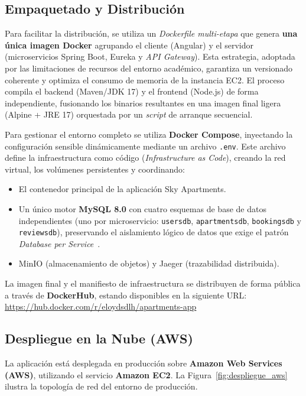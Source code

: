 \subsection{Empaquetado y Distribución}

Para facilitar la distribución, se utiliza un \textit{Dockerfile multi-etapa} que genera 
\textbf{una única imagen Docker} agrupando el cliente (Angular) y el servidor (microservicios 
Spring Boot, Eureka y \textit{API Gateway}). Esta estrategia, adoptada por las limitaciones de recursos 
del entorno académico, garantiza un versionado coherente y optimiza el consumo de memoria de 
la instancia EC2. El proceso compila el backend (Maven/JDK 17) y el frontend (Node.js) de 
forma independiente, fusionando los binarios resultantes en una imagen final ligera 
(Alpine + JRE 17) orquestada por un \textit{script} de arranque secuencial.

Para gestionar el entorno completo se utiliza \textbf{Docker Compose}, inyectando la 
configuración sensible dinámicamente mediante un archivo \texttt{.env}. Este archivo define 
la infraestructura como código (\textit{Infrastructure as Code}), creando la red virtual, 
los volúmenes persistentes y coordinando:
\begin{itemize}
    \item El contenedor principal de la aplicación Sky Apartments.
    \item Un único motor \textbf{MySQL 8.0} con cuatro esquemas de base de datos independientes 
    (uno por microservicio: \texttt{usersdb}, \texttt{apartmentsdb}, \texttt{bookingsdb} y 
    \texttt{reviewsdb}), preservando el aislamiento lógico de datos que exige el patrón 
    \textit{Database per Service}~\cite[Cap.~5]{richardson2018}.
    \item MinIO (almacenamiento de objetos) y Jaeger (trazabilidad distribuida).
\end{itemize}

La imagen final y el manifiesto de infraestructura se distribuyen de forma pública a través 
de \textbf{DockerHub}, estando disponibles en la siguiente URL: \\
\url{https://hub.docker.com/r/eloydsdlh/apartments-app}

\subsection{Despliegue en la Nube (AWS)}

La aplicación está desplegada en producción sobre \textbf{Amazon Web Services (AWS)}, 
utilizando el servicio \textbf{Amazon EC2}. La Figura~\ref{fig:despliegue_aws} ilustra 
la topología de red del entorno de producción.

